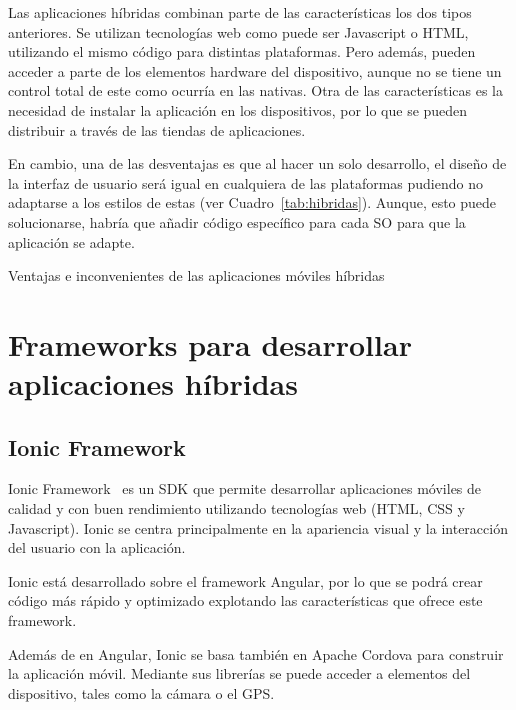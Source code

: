 Las aplicaciones híbridas combinan parte de las características los dos tipos anteriores. Se utilizan tecnologías web 
como puede ser Javascript o HTML, utilizando el mismo código para distintas plataformas. Pero además, pueden 
acceder a parte de los elementos hardware del dispositivo, aunque no se tiene un control total de este como 
ocurría en las nativas. Otra de las características es la necesidad de instalar la aplicación en los dispositivos, por 
lo que se pueden distribuir a través de las tiendas de aplicaciones.

En cambio, una de las desventajas es que al hacer un solo desarrollo, el diseño de la interfaz de usuario será igual
en cualquiera de las plataformas pudiendo no adaptarse a los estilos de estas (ver Cuadro~\ref{tab:hibridas}). Aunque, esto puede solucionarse,
habría que añadir código específico para cada \acs{SO} para que la aplicación se adapte.

\begin{table}[hibridas]
	\centering
	{\small
		
	}
	\caption[Ventajas e inconvenientes de las aplicaciones móviles híbridas]
	{Ventajas e inconvenientes de las aplicaciones móviles híbridas~\cite{TIPAPP}}
	\label{tab:hibridas}
\end{table}

\section{Frameworks para desarrollar aplicaciones híbridas}

\subsection{Ionic Framework}

Ionic Framework~\cite{IONIC} es un SDK que permite desarrollar aplicaciones móviles de calidad y con buen 
rendimiento utilizando tecnologías web (HTML, CSS y Javascript). Ionic se centra principalmente en la apariencia 
visual y la interacción del usuario con la aplicación. 

Ionic está desarrollado sobre el framework Angular, por lo que se podrá crear código más rápido y optimizado 
explotando las características que ofrece este framework.

Además de en Angular, Ionic se basa también en Apache Cordova para construir la aplicación móvil. Mediante sus 
librerías se puede acceder a elementos del dispositivo, tales como la cámara o el \acs{GPS}.

